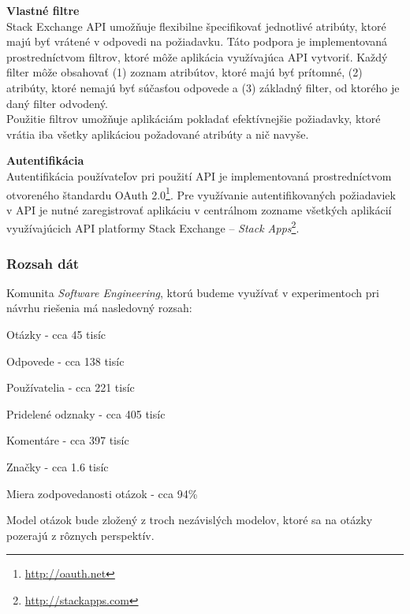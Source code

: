 \textbf{Vlastné filtre}\\
Stack Exchange API umožňuje flexibilne špecifikovať jednotlivé atribúty, ktoré majú byť vrátené v odpovedi na požiadavku.
Táto podpora je implementovaná prostredníctvom filtrov, ktoré môže aplikácia využívajúca API vytvoriť. Každý filter môže
obsahovať (1) zoznam atribútov, ktoré majú byť prítomné, (2) atribúty, ktoré nemajú byť súčasťou odpovede a (3) základný
filter, od ktorého je daný filter odvodený.\\
Použitie filtrov umožňuje aplikáciám pokladať efektívnejšie požiadavky, ktoré vrátia iba všetky aplikáciou požadované
atribúty a nič navyše.

\textbf{Autentifikácia}\\
Autentifikácia používateľov pri použití API je implementovaná prostredníctvom otvoreného štandardu
OAuth 2.0\footnote{\url{http://oauth.net}}. Pre využívanie autentifikovaných požiadaviek v API je nutné zaregistrovať
aplikáciu v centrálnom zozname všetkých aplikácií využívajúcich API platformy Stack Exchange --
\textit{Stack Apps}\footnote{\url{http://stackapps.com}}.

\subsubsection{Rozsah dát}

Komunita \textit{Software Engineering}, ktorú budeme využívať v experimentoch pri návrhu riešenia má nasledovný rozsah:

\begin{my_itemize}
    \item{Otázky - cca 45 tisíc}
    \item{Odpovede - cca 138 tisíc}
    \item{Používatelia - cca 221 tisíc}
    \item{Pridelené odznaky - cca 405 tisíc}
    \item{Komentáre - cca 397 tisíc}
    \item{Značky - cca 1.6 tisíc}
    \item{Miera zodpovedanosti otázok - cca 94\%}
\end{my_itemize}












Model otázok bude zložený z troch nezávislých modelov, ktoré sa na otázky pozerajú z rôznych perspektív.


